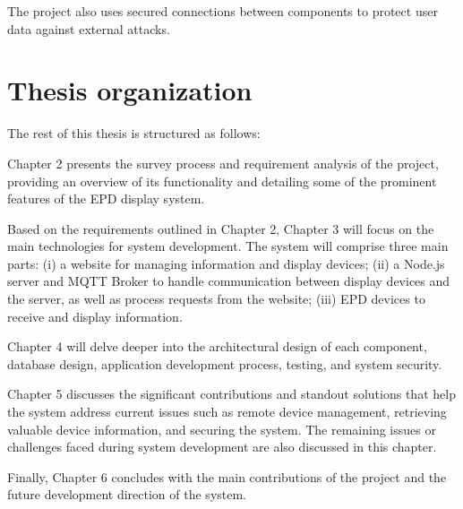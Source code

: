 \documentclass[../Main.tex]{subfiles}
\begin{document}
The project also uses secured connections between components to protect user data against external attacks.
\section{Thesis organization}
\label{section:1.4}

The rest of this thesis is structured as follows:

Chapter 2 presents the survey process and requirement analysis of the project, providing an overview of its functionality and detailing some of the prominent features of the EPD display system.

Based on the requirements outlined in Chapter 2, Chapter 3 will focus on the main technologies for system development. The system will comprise three main parts: (i) a website for managing information and display devices; (ii) a Node.js server and MQTT Broker to handle communication between display devices and the server, as well as process requests from the website; (iii) EPD devices to receive and display information.

Chapter 4 will delve deeper into the architectural design of each component, database design, application development process, testing, and system security.

Chapter 5 discusses the significant contributions and standout solutions that help the system address current issues such as remote device management, retrieving valuable device information, and securing the system. The remaining issues or challenges faced during system development are also discussed in this chapter.

Finally, Chapter 6 concludes with the main contributions of the project and the future development direction of the system.
\end{document}
